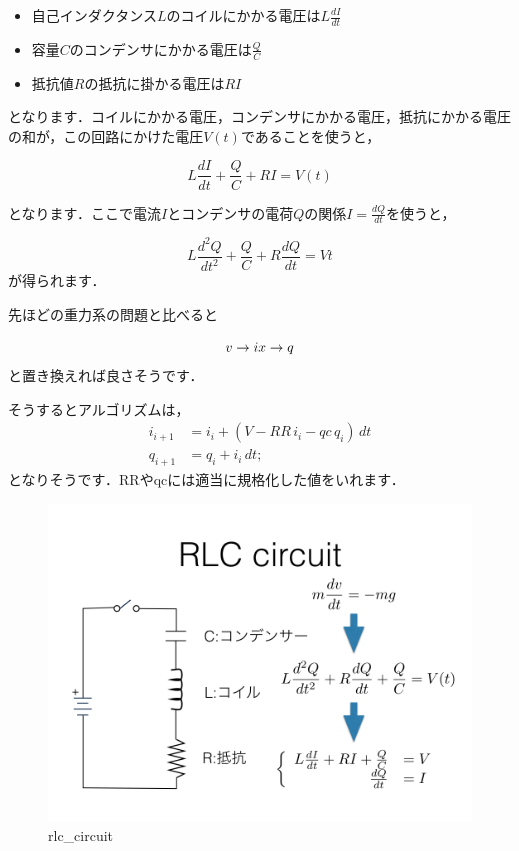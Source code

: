 \documentclass[11pt]{article}
\makeatletter
\def\maxwidth{\ifdim\Gin@nat@width>\linewidth\linewidth
    \else\Gin@nat@width\fi}
\let\Oldincludegraphics\includegraphics
\renewcommand{\includegraphics}[1]{\Oldincludegraphics[width=.8\maxwidth]{#1}}
\providecommand{\tightlist}{%
      \setlength{\itemsep}{0pt}\setlength{\parskip}{0pt}}
\makeatother
\begin{document}
\begin{itemize}
\tightlist
\item
  自己インダクタンス\(L\)のコイルにかかる電圧は\(L \frac{dI}{dt}\)
\item
  容量\(C\)のコンデンサにかかる電圧は\(\frac{Q}{C}\)
\item
  抵抗値\(R\)の抵抗に掛かる電圧は\(RI\)
\end{itemize}

となります．コイルにかかる電圧，コンデンサにかかる電圧，抵抗にかかる電圧の和が，この回路にかけた電圧\(V(t)\)であることを使うと，

\[
L \frac{dI}{dt} + \frac{Q}{C} + RI = V(t)
\]

となります．ここで電流\(I\)とコンデンサの電荷\(Q\)の関係\(I=\frac{dQ}{dt}\)を使うと，

\[
L \frac{d^2Q}{dt^2} + \frac{Q}{C} + R\frac{dQ}{dt} = V{t}
\] が得られます．

先ほどの重力系の問題と比べると

\[
v \rightarrow i \\
x \rightarrow q
\] と置き換えれば良さそうです．

そうするとアルゴリズムは， \[
\begin{aligned}
i_{i+1} & = i_i + (V - RR \, i_i -qc \, q_i) \, dt \\
q_{i+1} & = q_i + i_i \, dt;
\end{aligned}
\] となりそうです．RRやqcには適当に規格化した値をいれます．

\begin{figure}[htbp]
\centering
\includegraphics{../figs/ode.005.jpeg}
\caption{rlc\_circuit}
\end{figure}
\end{document}
